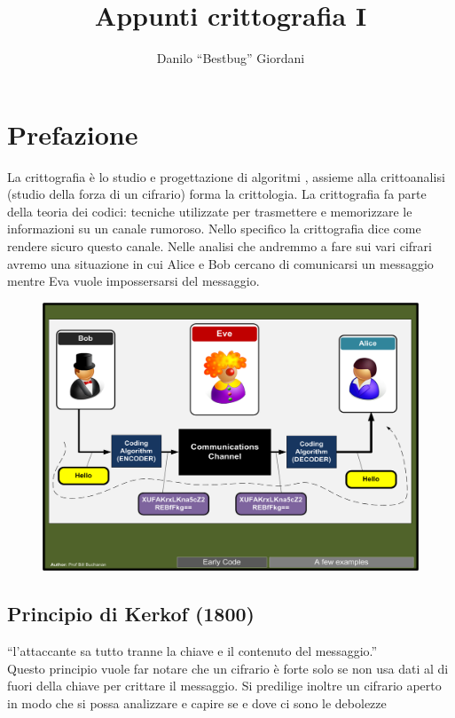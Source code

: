 \documentclass[10pt,a4paper]{article}
\author{Danilo ``Bestbug'' Giordani}
\title{Appunti crittografia I}
\begin{document}
\maketitle
\section{Prefazione}
La crittografia è lo studio e progettazione di algoritmi , assieme alla crittoanalisi (studio della forza di un cifrario) forma la crittologia. La crittografia fa parte della teoria dei codici: tecniche utilizzate per trasmettere e memorizzare le informazioni su un canale rumoroso. Nello specifico la crittografia dice come rendere sicuro questo canale. Nelle analisi che andremmo a fare sui vari cifrari avremo una situazione in cui Alice e Bob cercano di comunicarsi un messaggio mentre Eva vuole impossersarsi del messaggio.

\begin{figure}[htbp]
\includegraphics[scale=0.4]{immagini/eve1.png}
\end{figure}

\subsection{Principio di Kerkof (1800)}
 ``l'attaccante sa tutto tranne la chiave e il contenuto del messaggio.''\\
Questo principio vuole far notare che un cifrario è forte solo se non usa dati al di fuori della chiave per crittare il messaggio. Si predilige inoltre un cifrario aperto in modo che si possa analizzare e capire se e dove ci sono le debolezze
\newpage
\end{document}
